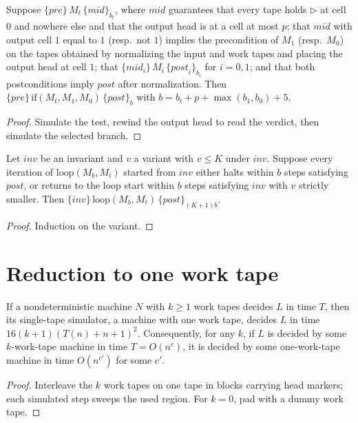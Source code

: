 \begin{theorem}
  \label{thm:models-if-hoare}
  \leanok
  Suppose $\{\mathit{pre}\}\, M_t\, \{\mathit{mid}\}_{b_t}$, where $\mathit{mid}$
  guarantees that every tape holds $\triangleright$ at cell $0$ and nowhere
  else and that the output head is at a cell at most $p$; that $\mathit{mid}$
  with output cell $1$ equal to $1$ (resp.\ not $1$) implies the precondition
  of $M_1$ (resp.\ $M_0$) on the tapes obtained by normalizing the input and
  work tapes and placing the output head at cell $1$; that
  $\{\mathit{mid}_i\}\, M_i\, \{\mathit{post}_i\}_{b_i}$ for $i = 0, 1$; and that
  both postconditions imply $\mathit{post}$ after normalization. Then
  $\{\mathit{pre}\}\, \mathrm{if}(M_t, M_1, M_0)\, \{\mathit{post}\}_b$ with
  $b = b_t + p + \max(b_1, b_0) + 5$.
\end{theorem}
\begin{proof}
  \leanok
  Simulate the test, rewind the output head to read the verdict, then
  simulate the selected branch.
\end{proof}

\begin{theorem}
  \label{thm:models-loop-hoare}
  \leanok
  Let $\mathit{inv}$ be an invariant and $v$ a variant with $v \le K$ under
  $\mathit{inv}$. Suppose every iteration of $\mathrm{loop}(M_b, M_t)$ started
  from $\mathit{inv}$ either halts within $b$ steps satisfying $\mathit{post}$,
  or returns to the loop start within $b$ steps satisfying $\mathit{inv}$ with
  $v$ strictly smaller. Then
  $\{\mathit{inv}\}\, \mathrm{loop}(M_b, M_t)\, \{\mathit{post}\}_{(K+1) b}$.
\end{theorem}
\begin{proof}
  \leanok
  Induction on the variant.
\end{proof}

\section{Reduction to one work tape}

\begin{theorem}
  \label{thm:models-ntm-single-tape}
  \leanok
  If a nondeterministic machine $N$ with $k \ge 1$ work tapes decides $L$ in
  time $T$, then its single-tape simulator, a machine with one work tape,
  decides $L$ in time $16(k+1)(T(n) + n + 1)^2$. Consequently, for any $k$, if
  $L$ is decided by some $k$-work-tape machine in time $T = O(n^c)$, it is
  decided by some one-work-tape machine in time $O(n^{c'})$ for some $c'$.
\end{theorem}
\begin{proof}
  \leanok
  Interleave the $k$ work tapes on one tape in blocks carrying head markers;
  each simulated step sweeps the used region. For $k = 0$, pad with a dummy
  work tape.
\end{proof}

